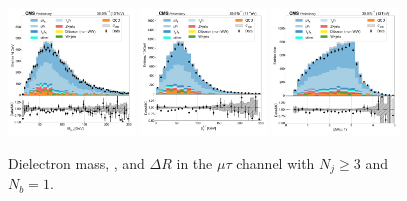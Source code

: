 \begin{figure}[htb!]
    \centering
    \includegraphics[width=0.3\textwidth]{chapters/Analysis/sectionPlots/figures/data_mc_overlays/mutau_2016_cat_gt3_eq1_signal_linear_lepton_dilepton1_mass}
    \includegraphics[width=0.3\textwidth]{chapters/Analysis/sectionPlots/figures/data_mc_overlays/mutau_2016_cat_gt3_eq1_signal_linear_lepton_dilepton1_pt}
    \includegraphics[width=0.3\textwidth]{chapters/Analysis/sectionPlots/figures/data_mc_overlays/mutau_2016_cat_gt3_eq1_signal_linear_lepton_dilepton1_delta_r}
    \caption{Dielectron mass, \pt, and $\Delta R$ in the $\mu\tau$ channel
    with $N_{j} \geq 3$ and $N_{b} = 1$.}
    \label{fig:analysis:plots:mutau_7_dilepton}
\end{figure}

